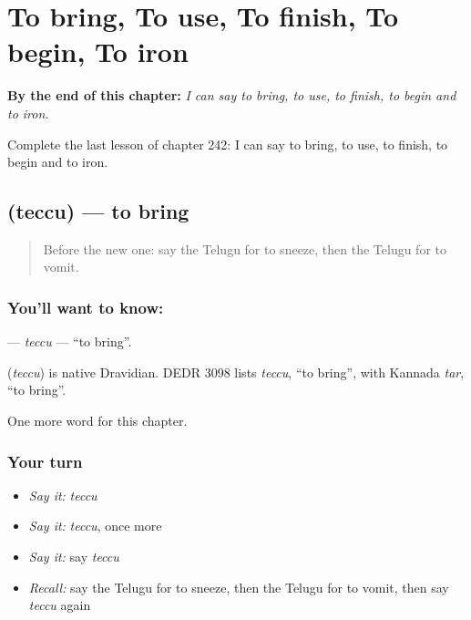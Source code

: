 
\chapter{To bring, To use, To finish, To begin, To iron}
\label{ch:te-to-bring-to-use-to-finish-to-begin-to-iron}

\begin{chapteropening}
\textbf{By the end of this chapter:} \emph{I can say to bring, to use, to finish, to begin and to iron.}

Complete the last lesson of chapter 242: I can say to bring, to use, to finish, to begin and to iron.
\end{chapteropening}

\section[\texorpdfstring{\te{తెచ్చు} (teccu)}{తెచ్చు (teccu)}]{ (teccu) — to bring}

\label{lesson:TE-C242-teccu}



\begin{quote}
Before the new one: say the Telugu for to sneeze, then the Telugu for to vomit.
\end{quote}

\subsection*{You'll want to know: }
\textbf{} — \emph{teccu} — \textquotedblleft{}to bring\textquotedblright{}.

\begin{cousinweb}
\textbf{} (\emph{teccu}) is native Dravidian. DEDR 3098 lists \emph{teccu}, \textquotedblleft{}to bring\textquotedblright{}, with Kannada \emph{tar}, \textquotedblleft{}to bring\textquotedblright{}.
\end{cousinweb}

\begin{grammarlens}[title={What you've built}]
One more word for this chapter.
\end{grammarlens}

\subsection*{Your turn}
\begin{itemize}
\raggedright
  \item \emph{Say it:} \emph{teccu}
  \item \emph{Say it:} \emph{teccu}, once more
  \item \emph{Say it:} say \emph{teccu}
  \item \emph{Recall:} say the Telugu for to sneeze, then the Telugu for to vomit, then say \emph{teccu} again
\end{itemize}

